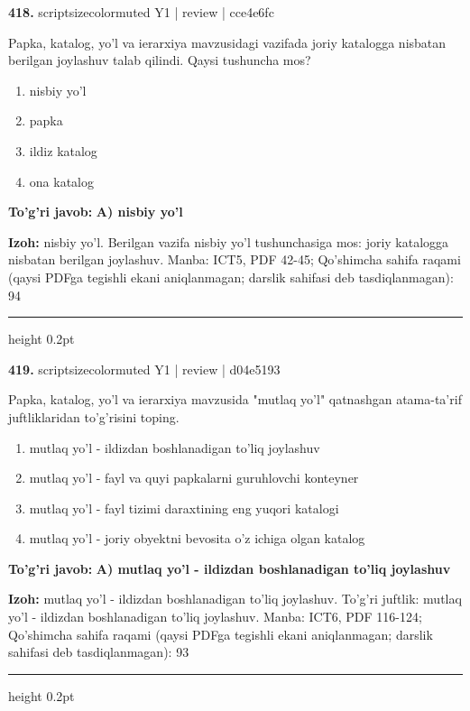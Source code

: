 \documentclass[10pt,a4paper]{article}
\begin{document}
{\bfseries\sffamily\color{ink} 418.} {scriptsizecolor{muted} Y1 | review | cce4e6fc}
\par
Papka, katalog, yo'l va ierarxiya mavzusidagi vazifada joriy katalogga nisbatan berilgan joylashuv talab qilindi. Qaysi tushuncha mos?
\begin{enumerate}[label=\Alph*),leftmargin=9mm]
\item nisbiy yo'l
\item papka
\item ildiz katalog
\item ona katalog
\end{enumerate}
\begin{tcolorbox}[enhanced,breakable,colback=teal!4,colframe=teal!60!black,boxrule=0.45pt,arc=1.2mm,left=2.7mm,right=2.7mm,top=1.8mm,bottom=1.8mm,before skip=2mm,after skip=2mm]
{\bfseries\sffamily\color{teal}To'g'ri javob:} \textbf{A) nisbiy yo'l}
\par\smallskip
{\bfseries Izoh:} nisbiy yo'l. Berilgan vazifa nisbiy yo'l tushunchasiga mos: joriy katalogga nisbatan berilgan joylashuv. Manba: ICT5, PDF 42-45; Qo'shimcha sahifa raqami (qaysi PDFga tegishli ekani aniqlanmagan; darslik sahifasi deb tasdiqlanmagan): 94
\end{tcolorbox}
\vspace{2mm}\hrule height 0.2pt\vspace{3mm}

{\bfseries\sffamily\color{ink} 419.} {scriptsizecolor{muted} Y1 | review | d04e5193}
\par
Papka, katalog, yo'l va ierarxiya mavzusida "mutlaq yo'l" qatnashgan atama-ta'rif juftliklaridan to'g'risini toping.
\begin{enumerate}[label=\Alph*),leftmargin=9mm]
\item mutlaq yo'l - ildizdan boshlanadigan to'liq joylashuv
\item mutlaq yo'l - fayl va quyi papkalarni guruhlovchi konteyner
\item mutlaq yo'l - fayl tizimi daraxtining eng yuqori katalogi
\item mutlaq yo'l - joriy obyektni bevosita o'z ichiga olgan katalog
\end{enumerate}
\begin{tcolorbox}[enhanced,breakable,colback=teal!4,colframe=teal!60!black,boxrule=0.45pt,arc=1.2mm,left=2.7mm,right=2.7mm,top=1.8mm,bottom=1.8mm,before skip=2mm,after skip=2mm]
{\bfseries\sffamily\color{teal}To'g'ri javob:} \textbf{A) mutlaq yo'l - ildizdan boshlanadigan to'liq joylashuv}
\par\smallskip
{\bfseries Izoh:} mutlaq yo'l - ildizdan boshlanadigan to'liq joylashuv. To'g'ri juftlik: mutlaq yo'l - ildizdan boshlanadigan to'liq joylashuv. Manba: ICT6, PDF 116-124; Qo'shimcha sahifa raqami (qaysi PDFga tegishli ekani aniqlanmagan; darslik sahifasi deb tasdiqlanmagan): 93
\end{tcolorbox}
\vspace{2mm}\hrule height 0.2pt\vspace{3mm}
\end{document}
